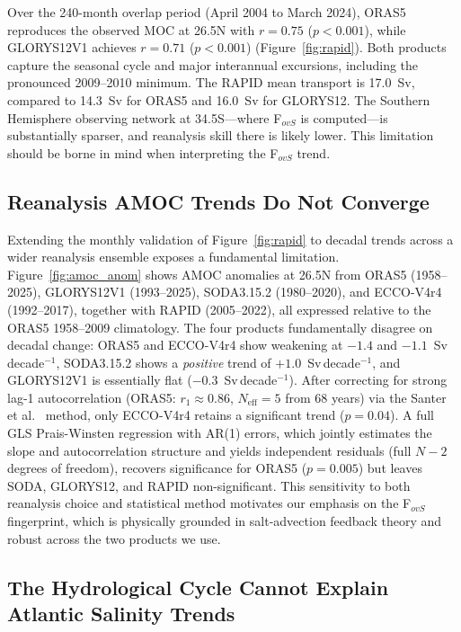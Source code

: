 \documentclass{agujournal2019}
\begin{document}
Over the 240-month overlap period (April 2004 to March 2024), ORAS5 reproduces the observed MOC at 26.5\textdegree N with $r = 0.75$ ($p < 0.001$), while GLORYS12V1 achieves $r = 0.71$ ($p < 0.001$) (Figure~\ref{fig:rapid}). Both products capture the seasonal cycle and major interannual excursions, including the pronounced 2009--2010 minimum. The RAPID mean transport is 17.0~Sv, compared to 14.3~Sv for ORAS5 and 16.0~Sv for GLORYS12. The Southern Hemisphere observing network at 34.5\textdegree S---where F$_{ovS}$ is computed---is substantially sparser, and reanalysis skill there is likely lower. This limitation should be borne in mind when interpreting the F$_{ovS}$ trend.

\subsection{Reanalysis AMOC Trends Do Not Converge}

Extending the monthly validation of Figure~\ref{fig:rapid} to decadal trends across a wider reanalysis ensemble exposes a fundamental limitation. Figure~\ref{fig:amoc_anom} shows AMOC anomalies at 26.5\textdegree N from ORAS5 (1958--2025), GLORYS12V1 (1993--2025), SODA3.15.2 (1980--2020), and ECCO-V4r4 (1992--2017), together with RAPID (2005--2022), all expressed relative to the ORAS5 1958--2009 climatology. The four products fundamentally disagree on decadal change: ORAS5 and ECCO-V4r4 show weakening at $-1.4$ and $-1.1$~Sv\,decade$^{-1}$, SODA3.15.2 shows a \emph{positive} trend of $+1.0$~Sv\,decade$^{-1}$, and GLORYS12V1 is essentially flat ($-0.3$~Sv\,decade$^{-1}$). After correcting for strong lag-1 autocorrelation (ORAS5: $r_1 \approx 0.86$, $N_{\text{eff}} = 5$ from 68 years) via the Santer et al.\ \cite{Santer2000} method, only ECCO-V4r4 retains a significant trend ($p = 0.04$). A full GLS Prais-Winsten regression with AR(1) errors, which jointly estimates the slope and autocorrelation structure and yields independent residuals (full $N-2$ degrees of freedom), recovers significance for ORAS5 ($p = 0.005$) but leaves SODA, GLORYS12, and RAPID non-significant. This sensitivity to both reanalysis choice and statistical method motivates our emphasis on the F$_{ovS}$ fingerprint, which is physically grounded in salt-advection feedback theory and robust across the two products we use.

\subsection{The Hydrological Cycle Cannot Explain Atlantic Salinity Trends}
\end{document}
